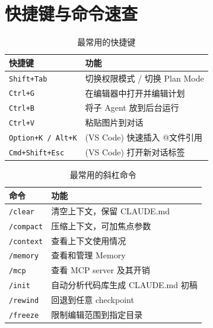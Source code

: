 \section{快捷键与命令速查}

\begin{table}[H]
\centering
\caption{最常用的快捷键}
\begin{tabular}{ll}
\toprule
\textbf{快捷键} & \textbf{功能} \\
\midrule
\texttt{Shift+Tab} & 切换权限模式 / 切换 Plan Mode \\
\texttt{Ctrl+G} & 在编辑器中打开并编辑计划 \\
\texttt{Ctrl+B} & 将子 Agent 放到后台运行 \\
\texttt{Ctrl+V} & 粘贴图片到对话 \\
\texttt{Option+K / Alt+K} & (VS Code) 快速插入 @文件引用 \\
\texttt{Cmd+Shift+Esc} & (VS Code) 打开新对话标签 \\
\bottomrule
\end{tabular}
\end{table}

\begin{table}[H]
\centering
\caption{最常用的斜杠命令}
\begin{tabular}{ll}
\toprule
\textbf{命令} & \textbf{功能} \\
\midrule
\texttt{/clear} & 清空上下文，保留 CLAUDE.md \\
\texttt{/compact} & 压缩上下文，可加焦点参数 \\
\texttt{/context} & 查看上下文使用情况 \\
\texttt{/memory} & 查看和管理 Memory \\
\texttt{/mcp} & 查看 MCP server 及其开销 \\
\texttt{/init} & 自动分析代码库生成 CLAUDE.md 初稿 \\
\texttt{/rewind} & 回退到任意 checkpoint \\
\texttt{/freeze} & 限制编辑范围到指定目录 \\
\bottomrule
\end{tabular}
\end{table}

